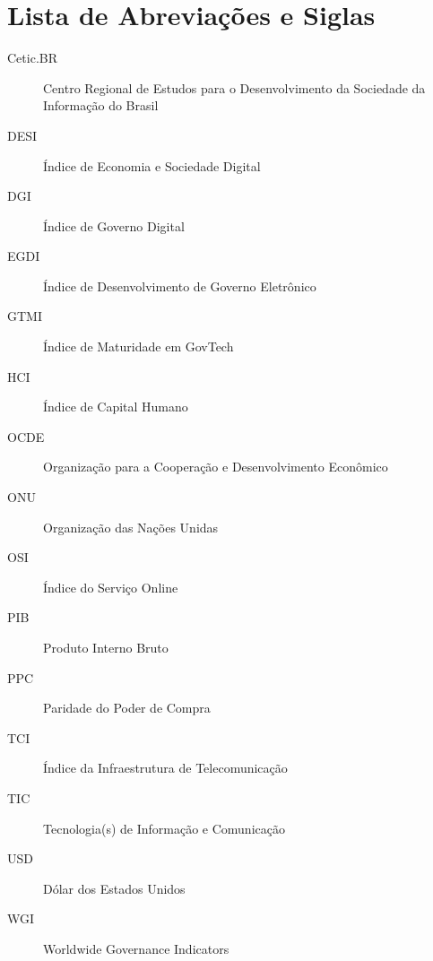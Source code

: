 \chapter*{Lista de Abreviações e Siglas}

\begin{description}
    \item[Cetic.BR] Centro Regional de Estudos para o Desenvolvimento da Sociedade da Informação do Brasil
    \item[DESI] Índice de Economia e Sociedade Digital
    \item[DGI] Índice de Governo Digital
    \item[EGDI] Índice de Desenvolvimento de Governo Eletrônico
    \item[GTMI] Índice de Maturidade em GovTech
    \item[HCI] Índice de Capital Humano
    \item[OCDE] Organização para a Cooperação e Desenvolvimento Econômico
    \item[ONU] Organização das Nações Unidas
    \item[OSI] Índice do Serviço Online
    \item[PIB] Produto Interno Bruto
    \item[PPC] Paridade do Poder de Compra
    \item[TCI] Índice da Infraestrutura de Telecomunicação
    \item[TIC] Tecnologia(s) de Informação e Comunicação
    \item[USD] Dólar dos Estados Unidos
    \item[WGI] Worldwide Governance Indicators
\end{description}